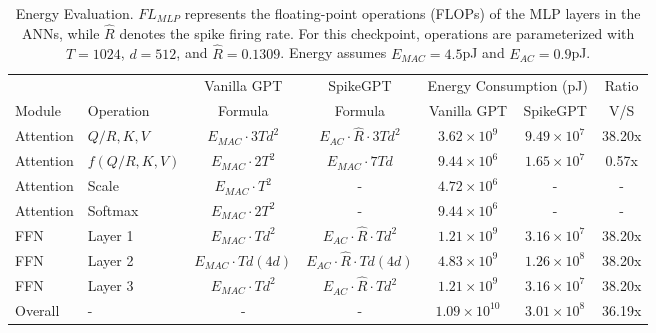 \begin{table}[t]
\centering
\caption{Energy Evaluation. $F L_{MLP}$ represents the floating-point operations (FLOPs) of the MLP layers in the ANNs, while $\hat{R}$ denotes the spike firing rate. For this checkpoint, operations are parameterized with $T=1024$, $d=512$, and $\hat{R}=0.1309$. Energy assumes $E_{MAC}=4.5$pJ and $E_{AC}=0.9$pJ.}
\begin{tabular}{llccccc}
\hline
 &  & Vanilla GPT & SpikeGPT & \multicolumn{2}{c}{Energy Consumption (pJ)} & Ratio \\
\cline{5-6}
Module & Operation & Formula & Formula & Vanilla GPT & SpikeGPT & V/S \\
\hline
Attention & $Q/R, K, V$ & $E_{MAC} \cdot 3Td^2$ & $E_{AC} \cdot \hat{R} \cdot 3Td^2$ & $3.62 \times 10^{9}$ & $9.49 \times 10^{7}$ & 38.20x \\
Attention & $f(Q/R,K,V)$ & $E_{MAC} \cdot 2T^2$ & $E_{MAC} \cdot 7Td$ & $9.44 \times 10^{6}$ & $1.65 \times 10^{7}$ & 0.57x \\
Attention & Scale & $E_{MAC} \cdot T^2$ & - & $4.72 \times 10^{6}$ & - & - \\
Attention & Softmax & $E_{MAC} \cdot 2T^2$ & - & $9.44 \times 10^{6}$ & - & - \\
\hline
FFN & Layer 1 & $E_{MAC} \cdot Td^2$ & $E_{AC} \cdot \hat{R} \cdot Td^2$ & $1.21 \times 10^{9}$ & $3.16 \times 10^{7}$ & 38.20x \\
FFN & Layer 2 & $E_{MAC} \cdot T d (4d)$ & $E_{AC} \cdot \hat{R} \cdot T d (4d)$ & $4.83 \times 10^{9}$ & $1.26 \times 10^{8}$ & 38.20x \\
FFN & Layer 3 & $E_{MAC} \cdot Td^2$ & $E_{AC} \cdot \hat{R} \cdot Td^2$ & $1.21 \times 10^{9}$ & $3.16 \times 10^{7}$ & 38.20x \\
\hline
Overall & - & - & - & $1.09 \times 10^{10}$ & $3.01 \times 10^{8}$ & 36.19x \\
\hline
\end{tabular}
\end{table}
